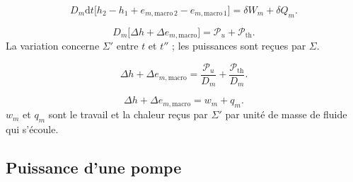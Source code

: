 \documentclass[11pt,a4paper]{article}
\newcommand{\dd}{\mathrm d}
\begin{document}
\[D_m\dd t\bigl[h_2-h_1+e_{m,\mathrm{macro}\,2}-e_{m,\mathrm{macro}\,1}\bigr]=\delta W_m+\delta Q_m.\]
\begin{cadre}\[D_m\bigl[\Delta h+\Delta e_{m,\mathrm{macro}}\bigr]=\mathcal P_u+\mathcal P_{\mathrm{th}}.\]La variation concerne $\Sigma'$ entre $t$ et $t''$ ; les puissances sont reçues par $\Sigma$.\end{cadre}
\[\Delta h+\Delta e_{m,\mathrm{macro}}=\frac{\mathcal P_u}{D_m}+\frac{\mathcal P_{\mathrm{th}}}{D_m}.\]
\begin{cadre}\[\Delta h+\Delta e_{m,\mathrm{macro}}=w_m+q_m.\]$w_m$ et $q_m$ sont le travail et la chaleur reçus par $\Sigma'$ par unité de masse de fluide qui s'écoule.\end{cadre}
\Needspace{65mm}
\subsection{Puissance d'une pompe}
\end{document}

